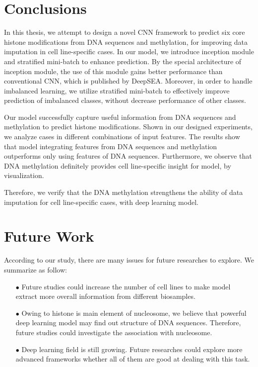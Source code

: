 \hspace{24pt}

\section{Conclusions}
In this thesis, we attempt to design a novel CNN framework to predict six core histone modifications from DNA sequences and methylation, for improving data imputation in cell line-specific cases. In our model, we introduce inception module and stratified mini-batch to enhance prediction. By the special architecture of inception module, the use of this module gains better performance than conventional CNN, which is published by DeepSEA. Moreover, in order to handle imbalanced learning, we utilize stratified mini-batch to effectively improve prediction of imbalanced classes, without decrease performance of other classes.

Our model successfully capture useful information from DNA sequences and methylation to predict histone modifications. Shown in our designed experiments, we analyze cases in different combinations of input features. The results show that model integrating features from DNA sequences and methylation outperforms only using features of DNA sequences. Furthermore, we observe that DNA methylation definitely provides cell line-specific insight for model, by visualization.

Therefore, we verify that the DNA methylation strengthens the ability of data imputation for cell line-specific cases, with deep learning model.

\section{Future Work}
According to our study, there are many issues for future researches to explore. We summarize as follow:

\begin{itemize}
\item[$\bullet$] Future studies could increase the number of cell lines to make model extract more overall information from different biosamples.
\item[$\bullet$] Owing to histone is main element of nucleosome, we believe that powerful deep learning model may find out structure of DNA sequences. Therefore, future studies could investigate the association with nucleosome.
\item[$\bullet$] Deep learning field is still growing. Future researches could explore more advanced frameworks whether all of them are good at dealing with this task.
\end{itemize}

